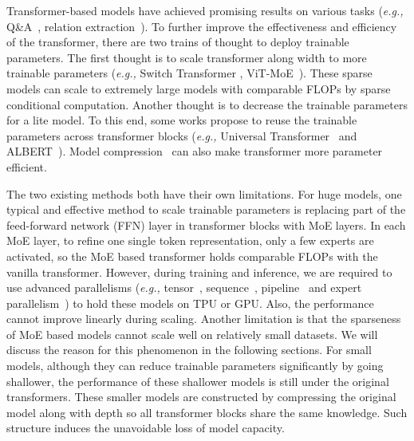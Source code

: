 \documentclass[letterpaper]{article} \usepackage{aaai22}  \usepackage{times}  \usepackage{helvet}  \usepackage{courier}  \usepackage[hyphens]{url}  \usepackage{graphicx} \urlstyle{rm} \def\UrlFont{\rm}  \usepackage{natbib}  \usepackage{caption} \DeclareCaptionStyle{ruled}{labelfont=normalfont,labelsep=colon,strut=off} \frenchspacing  \setlength{\pdfpagewidth}{8.5in}  \setlength{\pdfpageheight}{11in}  \usepackage{algorithm}
\newcommand{\eg}{\emph{e.g.,}\xspace}
\begin{document}
\noindent Transformer-based models have achieved promising results on various tasks (\eg Q\&A~\cite{qu2019bert,yang2020bert}, relation extraction~\cite{xue2020gdpnet,xue2020embarrassingly,zhou2020document}). To further improve the effectiveness and efficiency of the transformer, there are two trains of thought to deploy trainable parameters. The first thought is to scale transformer along width to more trainable parameters (\eg Switch Transformer \cite{fedus2021switch}, ViT-MoE~\cite{riquelme2021scaling}). These sparse models can scale to extremely large models with comparable FLOPs by sparse conditional computation. Another thought is to decrease the trainable parameters for a lite model. To this end, some works propose to reuse the trainable parameters across transformer blocks (\eg Universal Transformer~\cite{dehghani2018universal} and ALBERT~\cite{lan2019albert}). Model compression~\cite{xu-etal-2020-bert,sun-etal-2019-patient} can also make transformer more parameter efficient. 









The two existing methods both have their own limitations. For huge models, one typical and effective method to scale trainable parameters is replacing part of the feed-forward network (FFN) layer in transformer blocks with MoE layers. In each MoE layer, to refine one single token representation, only a few experts are activated, so the MoE based transformer holds comparable FLOPs with the vanilla transformer. However, during training and inference, we are required to use advanced parallelisms (\eg tensor~\cite{shoeybi2019megatron}, sequence~\cite{li2021sequence}, pipeline~\cite{huang2018gpipe} and expert parallelism~\cite{lepikhin2020gshard}) to hold these models on TPU or GPU. Also, the performance cannot improve linearly during scaling. Another limitation is that the sparseness of MoE based models cannot scale well on relatively small datasets. We will discuss the reason for this phenomenon in the following sections. For small models, although they can reduce trainable parameters significantly by going shallower, the performance of these shallower models is still under the original transformers. These smaller models are constructed by compressing the original model along with depth so all transformer blocks share the same knowledge. Such structure induces the unavoidable loss of model capacity.
\end{document}
